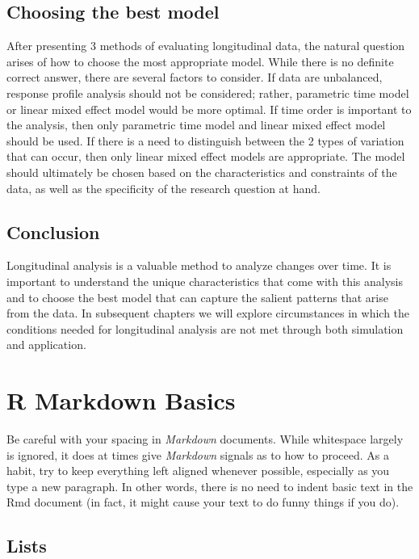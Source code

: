 \documentclass[12pt, twoside]{amherstthesis}
\theoremstyle{definition}
\theoremstyle{definition}
\theoremstyle{definition}
\theoremstyle{remark}
\begin{document}
\hypertarget{choosing-the-best-model}{%
\section{Choosing the best model}\label{choosing-the-best-model}}

After presenting 3 methods of evaluating longitudinal data, the natural question arises of how to choose the most appropriate model. While there is no definite correct answer, there are several factors to consider. If data are unbalanced, response profile analysis should not be considered; rather, parametric time model or linear mixed effect model would be more optimal. If time order is important to the analysis, then only parametric time model and linear mixed effect model should be used. If there is a need to distinguish between the 2 types of variation that can occur, then only linear mixed effect models are appropriate. The model should ultimately be chosen based on the characteristics and constraints of the data, as well as the specificity of the research question at hand.

\hypertarget{conclusion}{%
\section{Conclusion}\label{conclusion}}

Longitudinal analysis is a valuable method to analyze changes over time. It is important to understand the unique characteristics that come with this analysis and to choose the best model that can capture the salient patterns that arise from the data. In subsequent chapters we will explore circumstances in which the conditions needed for longitudinal analysis are not met through both simulation and application.

\hypertarget{rmd-basics}{%
\chapter{R Markdown Basics}\label{rmd-basics}}

Be careful with your spacing in \emph{Markdown} documents. While whitespace largely is ignored, it does at times give \emph{Markdown} signals as to how to proceed. As a habit, try to keep everything left aligned whenever possible, especially as you type a new paragraph. In other words, there is no need to indent basic text in the Rmd document (in fact, it might cause your text to do funny things if you do).

\hypertarget{lists}{%
\section{Lists}\label{lists}}
\end{document}

